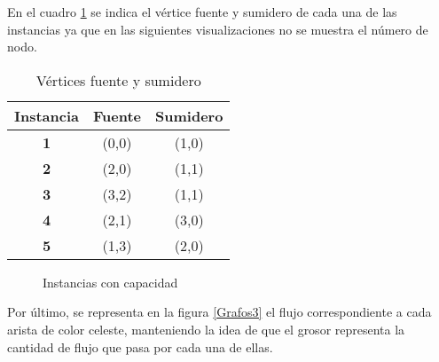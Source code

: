 \documentclass{article}
\begin{document}
En el cuadro \ref{cuadro1} se indica el vértice fuente y sumidero de cada una de las instancias ya que en las siguientes visualizaciones no se muestra el número de nodo.  
\begin{table}[H]
\centering
\caption{Vértices fuente y sumidero}
\begin{tabular}{|c|c|c|}
\hline
\multicolumn{1}{|l|}{\textbf{Instancia}} & \multicolumn{1}{l|}{\textbf{Fuente}} & \multicolumn{1}{l|}{\textbf{Sumidero}} \\ \hline
\textbf{1}                               & (0,0)                                & (1,0)                                  \\ \hline
\textbf{2}                               & (2,0)                                & (1,1)                                  \\ \hline
\textbf{3}                               & (3,2)                                & (1,1)                                  \\ \hline
\textbf{4}                               & (2,1)                                & (3,0)                                  \\ \hline
\textbf{5}                               & (1,3)                                & (2,0)                                  \\ \hline
\end{tabular}
\label{cuadro1}
\end{table}



\begin{figure}[H]
\centering
{}\hspace{5mm}
\vspace{5mm}
\hspace{5mm}
\vspace{5mm}
\caption{Instancias con capacidad} \label{Grafos2}
\end{figure}

\newpage
Por último, se representa en la figura \ref{Grafos3} el flujo correspondiente a cada arista de color celeste, manteniendo la idea de que el grosor representa la cantidad de flujo que pasa por cada una de ellas. 

\end{document}
